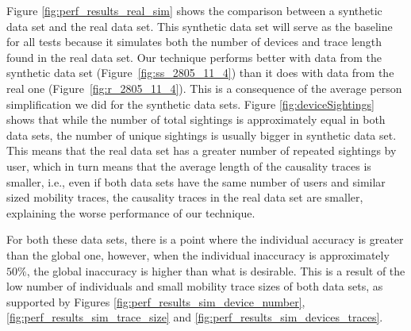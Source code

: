Figure \ref{fig:perf_results_real_sim} shows the comparison between a
synthetic data set and the real data set. This synthetic data set will
serve as the baseline for all tests because it simulates both the
number of devices and trace length found in the real data set.  Our
technique performs better with data from the synthetic data set
(Figure~\ref{fig:ss_2805_11_4}) than it does with data from the real
one (Figure~\ref{fig:r_2805_11_4}).  This is a consequence of the
average person simplification we did for the synthetic data
sets. Figure \ref{fig:deviceSightings} shows that while the number of
total sightings is approximately equal in both data sets, the number
of unique sightings is usually bigger in synthetic data set.  This
means that the real data set has a greater number of repeated
sightings by user, which in turn means that the average length of the
causality traces is smaller, i.e., even if both data sets have the same
number of users and similar sized mobility traces, the causality
traces in the real data set are smaller, explaining the worse
performance of our technique.

For both
these data sets, there is a point where the individual accuracy is
greater than the global one, however, when the individual inaccuracy
is approximately $50\%$, the global inaccuracy is higher than what is
desirable. This is a result of the low number of individuals and small
mobility trace sizes of both data sets, as supported by Figures
\ref{fig:perf_results_sim_device_number},
\ref{fig:perf_results_sim_trace_size} and
\ref{fig:perf_results_sim_devices_traces}.


